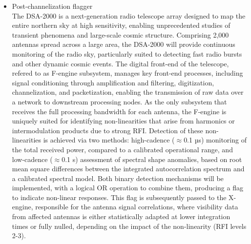 \begin{itemize}
\item Post-channelization flagger\\
The DSA-2000 is a next-generation radio telescope array designed to map the entire northern sky at high sensitivity, enabling unprecedented studies of transient phenomena and large-scale cosmic structure. Comprising 2,000 antennas spread across a large area, the DSA-2000 will provide continuous monitoring of the radio sky, particularly suited to detecting fast radio bursts and other dynamic cosmic events. The digital front-end of the telescope, refered to as F-engine subsystem, manages key front-end processes, including signal conditioning through amplification and filtering, digitization, channelization, and packetization, enabling the transmission of raw data over a network to downstream processing nodes. As the only subsystem that receives the full processing bandwidth for each antenna, the F-engine is uniquely suited for identifying non-linearities that arise from harmonics or intermodulation products due to strong RFI. Detection of these non-linearities is achieved via two methods: high-cadence ($\approx$0.1 µs) monitoring of the total received power, compared to a calibrated operational range, and low-cadence ($\approx$0.1 s) assessment of spectral shape anomalies, based on root mean square differences between the integrated autocorrelation spectrum and a calibrated spectral model. Both binary detection mechanisms will be implemented, with a logical OR operation to combine them, producing a flag to indicate non-linear responses. This flag is subsequently passed to the X-engine, responsible for the antenna signal correlations, where visibility data from affected antennas is either statistically adapted at lower integration times or fully nulled, depending on the impact of the non-linearity (RFI levels 2-3).
\end{itemize}

